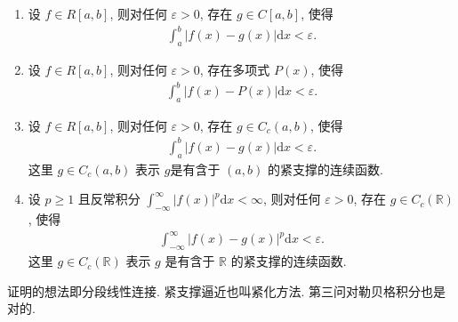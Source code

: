 \documentclass[../../main.tex]{subfiles}
\begin{document}
\begin{theorem}[可积被连续函数逼近]\label{theorem:可积被连续函数逼近}
\begin{enumerate}[(1)]
\item 设 $f \in R[a,b]$, 则对任何 $\varepsilon > 0$, 存在 $g \in C[a,b]$, 使得
\begin{align*}
\int_{a}^{b} |f(x) - g(x)|\mathrm{d}x < \varepsilon. 
\end{align*}

\item 设 $f \in R[a,b]$, 则对任何 $\varepsilon > 0$, 存在多项式 $P(x)$, 使得
\begin{align*}
\int_{a}^{b} |f(x) - P(x)|\mathrm{d}x < \varepsilon. 
\end{align*}

\item 设 $f \in R[a,b]$, 则对任何 $\varepsilon > 0$, 存在 $g \in C_c(a,b)$, 使得
\begin{align*}
\int_{a}^{b} |f(x) - g(x)|\mathrm{d}x < \varepsilon. 
\end{align*}
这里 $g\in C_c(a,b)$ 表示 $g$是有含于 $(a,b)$ 的紧支撑的连续函数.

\item 设 $p \geqslant 1$ 且反常积分 $\int_{-\infty}^{\infty} |f(x)|^{p}\mathrm{d}x < \infty$, 则对任何 $\varepsilon > 0$, 存在 $g \in C_c(\mathbb{R})$, 使得
\begin{align*}
\int_{-\infty}^{\infty} |f(x) - g(x)|^{p}\mathrm{d}x < \varepsilon.
\end{align*}
这里 $g\in C_c(\mathbb{R})$ 表示 $g$ 是有含于 $\mathbb{R}$ 的紧支撑的连续函数.
\end{enumerate}
\end{theorem}
\begin{note}
证明的想法即分段线性连接. 紧支撑逼近也叫紧化方法. 第三问对勒贝格积分也是对的.
\end{note}
\end{document}
